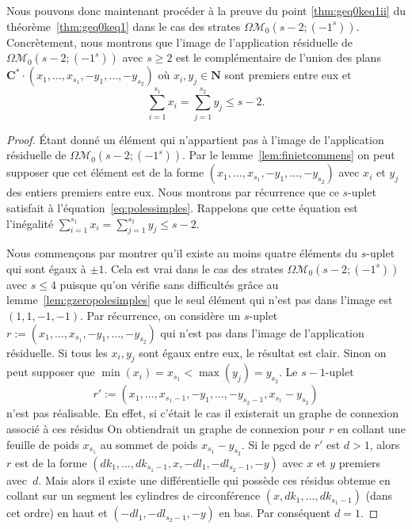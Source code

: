 \documentclass[11pt]{article}
\numberwithin{equation}{section}\renewcommand{\proofname}{Démonstration}
\let\mathcal\mathscr
\newcommand{\CC}{\mathbf{C}}
\newcommand{\NN}{\mathbf{N}}
\newcommand{\omoduli}[1][g]{{\Omega\mathcal M}_{\!#1}}
\theoremstyle{definition}
\begin{document}
Nous pouvons donc maintenant procéder à la preuve du point \eqref{thm:geq0keq1ii} du théorème~\ref{thm:geq0keq1} dans le cas des strates $\omoduli[0](s-2;(-1^{s}))$. Concrètement, nous montrons que l'image de l'application résiduelle de $\omoduli[0](s-2;(-1^{s}))$ avec $s\geq2$ est le complémentaire de l'union des plans $\CC^{\ast} \cdot (x_{1},\dots,x_{s_{1}},-y_{1},\dots,-y_{s_{2}})$ où $x_{i},y_{j} \in \NN$ sont premiers entre eux et
\begin{equation*}
\sum_{i=1}^{s_{1}} x_{i} = \sum_{j=1}^{s_{2}} y_{j} \leq s-2.
\end{equation*}
\begin{proof}
Étant donné un élément qui n’appartient pas à l'image de l'application résiduelle de $\omoduli[0](s-2;(-1^{s}))$. Par le lemme~\ref{lem:finietcommens} on peut supposer que cet élément est de la forme $(x_{1},\dots,x_{s_{1}},-y_{1},\dots,-y_{s_{2}})$ avec $x_{i}$ et $y_{j}$ des entiers premiers entre eux. Nous montrons par récurrence que ce $s$-uplet satisfait à l'équation~\eqref{eq:polessimples}.
Rappelons que cette équation est l'inégalité $\sum_{i=1}^{s_{1}} x_{i} = \sum_{j=1}^{s_{2}} y_{j} \leq s-2$.

Nous commençons par montrer qu'il existe au moins quatre éléments du $s$-uplet qui sont égaux à $\pm1$. Cela est vrai dans le cas des strates $\omoduli[0](s-2;(-1^{s}))$ avec $s\leq 4$ puisque qu'on vérifie sans difficultés grâce au lemme~\ref{lem:gzeropolesimples} que le seul élément qui n'est pas dans l'image est $(1,1,-1,-1)$. Par récurrence, on considère un $s$-uplet $r := (x_{1},\dots,x_{s_{1}},-y_{1},\dots,-y_{s_{2}})$ qui n'est pas dans l'image de l'application résiduelle. Si tous les $x_{i},y_{j}$ sont égaux entre eux, le résultat est clair. Sinon on peut supposer que $\min(x_{i}) = x_{s_{1}} < \max(y_{j}) = y_{s_{2}}$. Le $s-1$-uplet\vspace*{-3pt}\enlargethispage{.5\baselineskip}
\[
r' :=(x_{1},\dots,x_{s_{1}-1},-y_{1},\dots,-y_{s_{2}-1},x_{s_{1}}-y_{s_{2}})
\]
n'est pas réalisable. En effet, si c'était le cas il existerait un graphe de connexion associé à ces résidus On obtiendrait un graphe de connexion pour $r$ en collant une feuille de poids $x_{s_{1}}$ au sommet de poids $x_{s_{1}}-y_{s_{2}}$. Si le pgcd de $r'$ est $d > 1$, alors~$r$ est de la forme $(dk_{1},\dots,dk_{s_{1}-1},x,-dl_{1},-dl_{s_{2}-1},-y)$ avec $x$ et $y$ premiers avec~$d$. Mais alors il existe une différentielle qui possède ces résidus obtenue en collant sur un segment les cylindres de circonférence $(x,dk_{1},\dots,dk_{s_{1}-1})$ (dans cet ordre) en haut et $(-dl_{1},-dl_{s_{2}-1},-y)$ en bas. Par conséquent $d=1$.


\end{proof}
\end{document}
